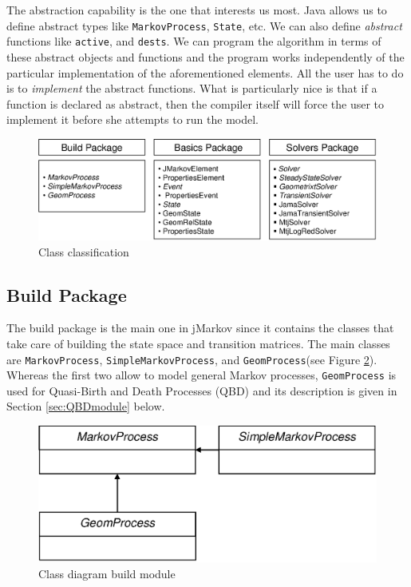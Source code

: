 \documentclass[11pt,letterpaper]{article}
\newcommand\SimpleMarkovProcess{\texttt{Simple\-Markov\-Pro\-cess}\xspace}
\newcommand\MarkovProcess{\texttt{Markov\-Pro\-cess}\xspace}
\newcommand\GeomProcess{\texttt{Geom\-Pro\-cess}\xspace}
\begin{document}
The abstraction capability is the one that interests us most.  Java allows us to
define abstract types like \MarkovProcess, \texttt{State}, etc.  We can also
define \emph{abstract} functions like \texttt{active}, and \texttt{dests}.  We
can program the algorithm in terms of these abstract objects and functions and
the program works independently of the particular implementation of the
aforementioned elements.  All the user has to do is to \textit{implement} the
abstract functions.  What is particularly nice is that if a function is declared
as abstract, then the compiler itself will force the user to implement it before
she attempts to run the model.


\begin{figure}[bt]
\centering
  \includegraphics[width=12cm]{pics/classClassification}
  \caption{Class classification}\label{fg:classClassification}
\end{figure}

\subsection{Build Package}\label{sc:BuildModule}

The build package is the main one in jMarkov since it contains the classes that
take care of building the state space and transition matrices.  The main classes
are \MarkovProcess, \SimpleMarkovProcess, and \GeomProcess (see Figure
\ref{fg:BuildModuleDiag}).  Wher\-eas the first two allow to model general
Markov processes, \GeomProcess is used for Quasi-Birth and Death Processes (QBD)
and its description is given in Section \ref{sec:QBDmodule} below.

\begin{figure}[htb]
  \includegraphics[width=0.95\columnwidth]{pics/buildModuleDiag}
  \caption{Class diagram build module}\label{fg:BuildModuleDiag}
\end{figure}
\end{document}
